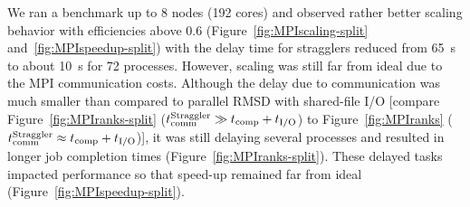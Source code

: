 We ran a benchmark up to 8 nodes (192 cores) and observed rather better scaling behavior with efficiencies above 0.6 (Figure~\ref{fig:MPIscaling-split} and~\ref{fig:MPIspeedup-split}) with the delay time for stragglers reduced from 65~s to about 10~s for 72 processes. 
However, scaling was still far from ideal due to the MPI communication costs. 
Although the delay due to communication was much smaller than compared to parallel RMSD with shared-file I/O [compare Figure~\ref{fig:MPIranks-split} ($t_{\text{comm}}^{\text{Straggler}} \gg {t}_{\text{comp}}+{t}_{\text{I/O}}$) to Figure~\ref{fig:MPIranks} ($t_{\text{comm}}^{\text{Straggler}} \approx {t}_{\text{comp}}+{t}_{\text{I/O}}$)], it was still delaying several processes and resulted in longer job completion times (Figure~\ref{fig:MPIranks-split}). 
These delayed tasks impacted performance so that speed-up remained far from ideal (Figure~\ref{fig:MPIspeedup-split}).

